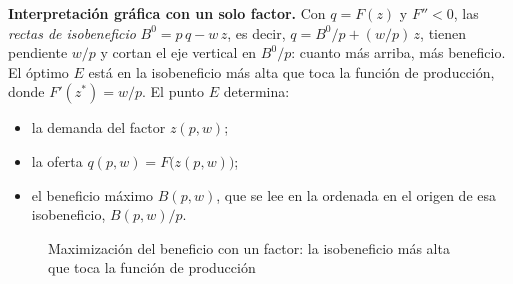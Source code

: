 \documentclass[11pt]{article}
\begin{document}
\begin{anotaciones}
\textbf{Interpretación gráfica con un solo factor.} Con $q=F(z)$ y $F''<0$, las \emph{rectas de isobeneficio} $B^0=p\,q-w\,z$, es decir, $q=B^0/p+(w/p)\,z$, tienen pendiente $w/p$ y cortan el eje vertical en $B^0/p$: cuanto más arriba, más beneficio. El óptimo $E$ está en la isobeneficio más alta que toca la función de producción, donde $F'(z^*)=w/p$. El punto $E$ determina:
\begin{itemize}
\item la demanda del factor $z(p,w)$;
\item la oferta $q(p,w)=F\big(z(p,w)\big)$;
\item el beneficio máximo $B(p,w)$, que se lee en la ordenada en el origen de esa isobeneficio, $B(p,w)/p$.
\end{itemize}
\end{anotaciones}

\begin{figure}[H]
\centering
\caption{Maximización del beneficio con un factor: la isobeneficio más alta que toca la función de producción}\label{fig:mb}
\end{figure}
\end{document}
